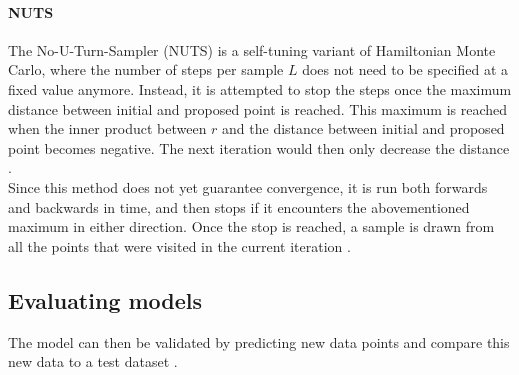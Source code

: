 \documentclass{article}
\begin{document}
\paragraph{NUTS}
The No-U-Turn-Sampler (NUTS) is a self-tuning variant of Hamiltonian Monte Carlo, where the number of steps per sample $L$ does not need to be specified at a fixed value anymore. Instead,
it is attempted to stop the steps once the maximum distance between initial and proposed point is reached. This maximum is reached when the inner product between $r$ and the distance between initial and proposed point becomes negative. The next iteration would then only decrease the distance  \cite{1439840954}.
\\
Since this method does not yet guarantee convergence, it is run both forwards and backwards in time, and then stops if it encounters the abovementioned maximum in either direction.
Once the stop is reached, a sample is drawn from all the points that were visited in the current iteration \cite{hoffman2014no}.



\subsection{Evaluating models}
The model can then be validated by predicting new data points and compare this new data to a test dataset \cite{1439840954}.
\end{document}
